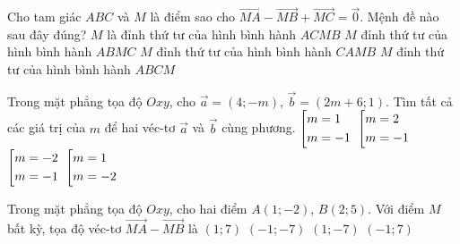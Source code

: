 \begin{ex}%
	Cho tam giác $ABC$ và $M$ là điểm sao cho $\vec{MA} - \vec{MB} + \vec{MC} = \vec{0}$. Mệnh đề nào sau đây đúng?
	\choice
	{$ M $ là đỉnh thứ tư của hình bình hành $ACMB$}
	{$ M $ đỉnh thứ tư của hình bình hành $ABMC$}
	{$ M $ đỉnh thứ tư của hình bình hành $CAMB$}
	{\True $ M $ đỉnh thứ tư của hình bình hành $ABCM$}
\end{ex}
\begin{ex}%
	Trong mặt phẳng tọa độ $Oxy$, cho $\vec{a} = (4; -m)$, $\vec{b} = (2m + 6; 1)$. Tìm tất cả các giá trị của $m$ để hai véc-tơ $\vec{a}$ và $\vec{b}$ cùng phương.
	\choice
	{$\left[\begin{aligned}&m =1 \\ &m = -1\end{aligned}\right.$}
	{$\left[\begin{aligned}&m = 2 \\ &m = -1\end{aligned}\right.$}
	{\True $\left[\begin{aligned}&m = -2 \\ &m = -1\end{aligned}\right.$}
	{$\left[\begin{aligned}&m = 1 \\ & m = -2\end{aligned}\right.$}
\end{ex}
\begin{ex}%
	Trong mặt phẳng tọa độ $Oxy$, cho hai điểm $A(1; -2)$, $B(2; 5)$. Với điểm $M$ bất kỳ, tọa độ véc-tơ $\vec{MA} - \vec{MB}$ là
	\choice
	{$(1; 7)$}
	{\True $(-1; -7)$}
	{$(1; -7)$}
	{$(-1; 7)$}
\end{ex}

